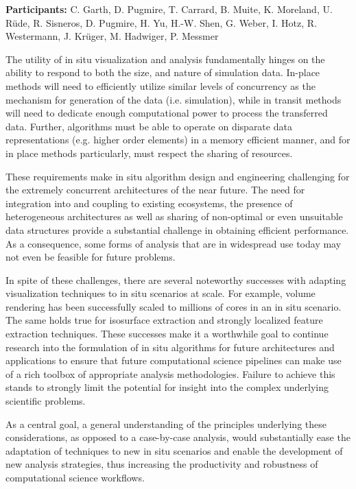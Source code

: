 
\license

\textbf{\sffamily Participants:} C. Garth, D. Pugmire, T. Carrard, B. Muite, K. Moreland, U. Rüde, R. Sisneros, D. Pugmire, H. Yu, H.-W. Shen, G. Weber, I. Hotz, R. Westermann, J. Krüger, M. Hadwiger, P. Messmer

 The utility of in situ visualization and analysis fundamentally hinges on the ability to respond to both the size, and nature of simulation data. In-place methods will need to efficiently utilize similar levels of concurrency as the mechanism for generation of the data (i.e. simulation), while in transit methods will need to dedicate enough computational power to process the transferred data. Further, algorithms must be able to operate on disparate data representations (e.g. higher order elements) in a memory efficient manner, and for in place methods particularly, must respect the sharing of resources.

These requirements make in situ algorithm design and engineering challenging for the extremely concurrent architectures of the near future. The need for integration into and coupling to existing ecosystems, the presence of heterogeneous architectures as well as sharing of non-optimal or even unsuitable data structures provide a substantial challenge in obtaining efficient performance. As a consequence, some forms of analysis that are in widespread use today may not even be feasible for future problems.

In spite of these challenges, there are several noteworthy successes with adapting visualization techniques to in situ scenarios at scale. For example, volume rendering has been successfully scaled to millions of cores in an in situ scenario. The same holds true for isosurface extraction and strongly localized feature extraction techniques. These successes make it a worthwhile goal to continue research into the formulation of in situ algorithms for future architectures and applications to ensure that future computational science pipelines can make use of a rich toolbox of appropriate analysis methodologies. Failure to achieve this stands to strongly limit the potential for insight into the complex underlying scientific problems.

As a central goal, a general understanding of the principles underlying these considerations, as opposed to a case-by-case analysis, would substantially ease the adaptation of techniques to new in situ scenarios and enable the development of new analysis strategies, thus increasing the productivity and robustness of computational science workflows.

